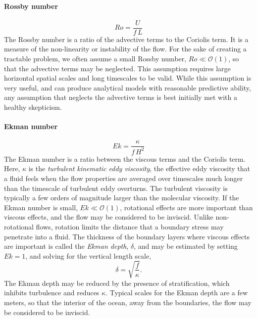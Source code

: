 \documentclass[11pt]{report}
\numberwithin{equation}{section}
\begin{document}
\paragraph{Rossby number} 
\begin{equation}
    Ro = \frac{U}{f\,L}
\end{equation}
The Rossby number is a ratio of the advective terms to the Coriolis term.  It is a measure of the non-linearity or instability of the flow.  For the sake of creating a tractable problem, we often assume a small Rossby number, $Ro\ll\mathcal{O}(1)$, so that the advective terms may be neglected.  This assumption requires large horizontal spatial scales and long timescales to be valid.  While this assumption is very useful, and can produce analytical models with reasonable predictive ability, any assumption that neglects the advective terms is best initially met with a healthy skepticism.

\paragraph{Ekman number} 
\begin{equation}
    Ek = \frac{\kappa}{f\,H^2}
\end{equation}
The Ekman number is a ratio between the viscous terms and the Coriolis term.  Here, $\kappa$ is the {\it turbulent kinematic eddy viscosity}, the effective eddy viscosity that a fluid feels when the flow properties are averaged over timescales much longer than the timescale of turbulent eddy overturns.  The turbulent viscosity is typically a few orders of magnitude larger than the molecular viscosity.  If the Ekman number is small, $Ek\ll\mathcal{O}(1)$, rotational effects are more important than viscous effects, and the flow may be considered to be inviscid.  Unlike non-rotational flows, rotation limits the distance that a boundary stress may penetrate into a fluid.  The thickness of the boundary layers where viscous effects are important is called the {\it Ekman depth}, $\delta$, and may be estimated by setting $Ek=1$, and solving for the vertical length scale,
\begin{equation}
    \delta = \sqrt{\frac{f}{\kappa}}.
\end{equation}
The Ekman depth may be reduced by the presence of stratification, which inhibits turbulence and reduces $\kappa$.  Typical scales for the Ekman depth are a few meters, so that the interior of the ocean, away from the boundaries, the flow may be considered to be inviscid.
\end{document}

